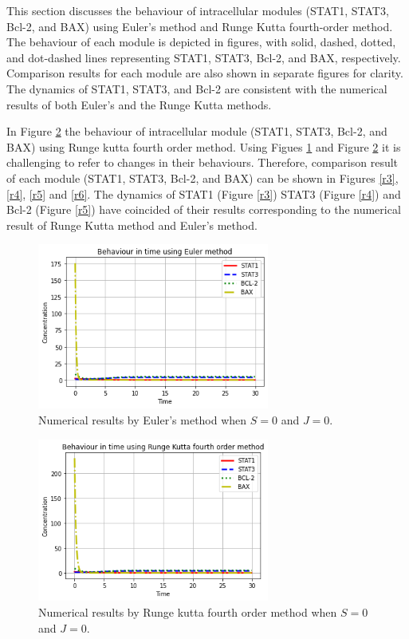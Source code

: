 This section discusses the behaviour of intracellular modules (STAT1, STAT3, Bcl-2, and BAX) using Euler's method and Runge Kutta fourth-order method. The behaviour of each module is depicted in figures, with solid, dashed, dotted, and dot-dashed lines representing STAT1, STAT3, Bcl-2, and BAX, respectively. Comparison results for each module are also shown in separate figures for clarity. The dynamics of STAT1, STAT3, and Bcl-2 are consistent with the numerical results of both Euler's and the Runge Kutta methods.

In Figure \ref{r2} the behaviour of intracellular module (STAT1, STAT3, Bcl-2, and BAX) using Runge kutta fourth order method. Using Figues \ref{r1} and Figure \ref{r2} it is challenging to refer to changes in their behaviours. Therefore, comparison result of each module (STAT1, STAT3, Bcl-2, and BAX) can be shown in Figures \ref{r3}, \ref{r4}, \ref{r5} and \ref{r6}. The dynamics of STAT1  (Figure \ref{r3}) STAT3  (Figure \ref{r4}) and Bcl-2 (Figure \ref{r5}) have coincided of their results corresponding to the numerical result of Runge Kutta method and Euler's method.  

\begin{figure}[hbt!]
	\centering
	\begin{framed}
	\includegraphics[width=0.68\textwidth]{Figures/A/N1.png}
		\end{framed}
	\caption{Numerical results by Euler's method when $S =0$ and $J=0$.}
	\label{r1}
\end{figure}


\begin{figure}[hbt!]
	\centering
	\begin{framed}
	\includegraphics[width=0.68\textwidth]{Figures/A/N2.png}
		\end{framed}
	\caption{Numerical results by Runge kutta fourth order method  when $S =0$ and $J=0$. }
	\label{r2}
\end{figure}

